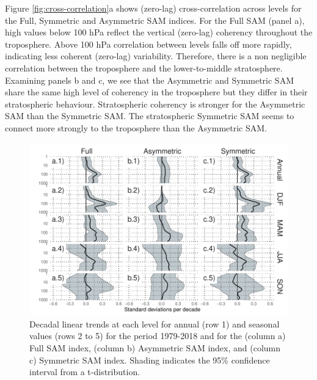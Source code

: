 \documentclass[]{ametsocV5}
\begin{document}
Figure \ref{fig:cross-correlation}a shows (zero-lag) cross-correlation
across levels for the Full, Symmetric and Asymmetric SAM indices. For
the Full SAM (panel a), high values below 100 hPa reflect the vertical
(zero-lag) coherency throughout the troposphere. Above 100 hPa
correlation between levels falls off more rapidly, indicating less
coherent (zero-lag) variability. Therefore, there is a non negligible
correlation between the troposphere and the lower-to-middle
stratosphere. Examining panels b and c, we see that the Asymmetric and
Symmetric SAM share the same high level of coherency in the troposphere
but they differ in their stratospheric behaviour. Stratospheric
coherency is stronger for the Asymmetric SAM than the Symmetric SAM. The
stratospheric Symmetric SAM seems to connect more strongly to the
troposphere than the Asymmetric SAM.

\begin{figure}
\includegraphics{trends-1} \caption[Decadal linear trends at each level for annual (row 1) and seasonal values (rows 2 to 5) for the period 1979-2018 and for the (column a) Full SAM index, (column b) Asymmetric SAM index, and (column c) Symmetric SAM index]{Decadal linear trends at each level for annual (row 1) and seasonal values (rows 2 to 5) for the period 1979-2018 and for the (column a) Full SAM index, (column b) Asymmetric SAM index, and (column c) Symmetric SAM index. Shading indicates the 95\% confidence interval from a t-distribution.}\label{fig:trends}
\end{figure}
\end{document}
